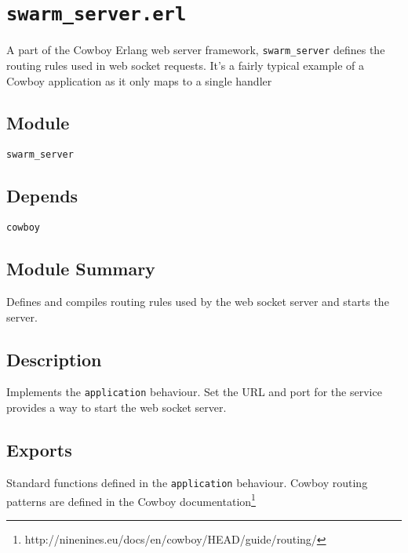 \pagestyle{empty}
\section{\tt swarm\_server.erl}
A part of the Cowboy Erlang web server framework, \verb+swarm_server+ defines the routing rules used in web socket requests. It's a fairly typical example of a Cowboy application  as it only maps to a single handler
\subsection{Module}
\verb+swarm_server+
\subsection{Depends}
{\tt cowboy}
\subsection{Module Summary}
Defines and compiles routing rules used by the web socket server and starts the server.
\subsection{Description}
Implements the \verb+application+ behaviour.
Set the URL and port for the service provides a way to start the web socket server.
\subsection{Exports}
Standard functions defined in the {\tt application} behaviour.
Cowboy routing patterns are defined in the Cowboy documentation\footnote{http://ninenines.eu/docs/en/cowboy/HEAD/guide/routing/}
\clearpage
\endinput
